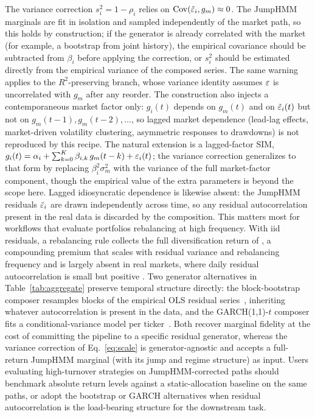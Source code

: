 The variance correction $s_i^2 = 1 - \rho_i$ relies on
$\mathrm{Cov}(\tilde{\varepsilon}_i, g_m) \approx 0$. The JumpHMM marginals are fit
in isolation and sampled independently of the market path, so this
holds by construction; if the generator is already correlated with
the market (for example, a bootstrap from joint history), the
empirical covariance should be subtracted from $\beta_i$ before
applying the correction, or $s_i^2$ should be estimated directly from
the empirical variance of the composed series. The same warning
applies to the $R^2$-preserving branch, whose variance identity
assumes $\varepsilon$ is uncorrelated with $g_m$ after any reorder. The
construction also injects a contemporaneous market factor only:
$g_i(t)$ depends on $g_m(t)$ and on $\tilde{\varepsilon}_i(t)$ but not on
$g_m(t-1), g_m(t-2), \dots$, so lagged market dependence (lead-lag
effects, market-driven volatility clustering, asymmetric responses to
drawdowns) is not reproduced by this recipe. The natural extension is
a lagged-factor SIM,
$g_i(t) = \alpha_i + \sum_{k=0}^K \beta_{i,k}\, g_m(t - k) + \varepsilon_i(t)$;
the variance correction generalizes to that form by replacing
$\beta_i^2 \sigma_m^2$ with the variance of the full market-factor
component, though the empirical value of the extra parameters is
beyond the scope here. Lagged idiosyncratic dependence is likewise
absent: the JumpHMM residuals $\tilde{\varepsilon}_i$ are drawn independently
across time, so any residual autocorrelation present in the real
data is discarded by the composition. This matters most for
workflows that evaluate portfolios rebalancing at high frequency.
With iid residuals, a rebalancing rule collects the full
diversification return of \cite{boothFama1992}, a compounding
premium that scales with residual variance and rebalancing frequency
and is largely absent in real markets, where daily residual
autocorrelation is small but positive \cite{boucheyGunthorpSutherland2012}.
Two generator alternatives in Table~\ref{tab:aggregate} preserve
temporal structure directly: the block-bootstrap composer resamples
blocks of the empirical OLS residual series~\cite{politisRomano1994},
inheriting whatever autocorrelation is present in the data, and the
GARCH(1,1)-$t$ composer fits a conditional-variance model per
ticker~\cite{bollerslev1986}. Both recover marginal fidelity at the
cost of committing the pipeline to a specific residual generator,
whereas the variance correction of Eq.~\eqref{eq:scale} is
generator-agnostic and accepts a full-return JumpHMM marginal (with
its jump and regime structure) as input. Users evaluating
high-turnover strategies on JumpHMM-corrected paths should benchmark
absolute return levels against a static-allocation baseline on the
same paths, or adopt the bootstrap or GARCH alternatives when
residual autocorrelation is the load-bearing structure for the
downstream task.

